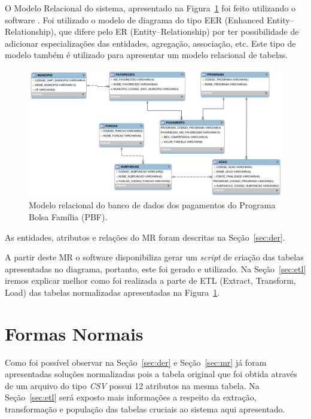 \documentclass[12pt]{article}
\begin{document}
	O Modelo Relacional do sistema, apresentado na Figura~\ref{fig:mr} foi feito utilizando o software \cite{mysql}. Foi utilizado o modelo de diagrama do tipo EER (Enhanced Entity–Relationship), que difere pelo ER (Entity–Relationship) por ter possibilidade de adicionar especializações das entidades, agregação, associação, etc. Este tipo de modelo também é utilizado para apresentar um modelo relacional de tabelas.
	
	\begin{figure}[H]
		\centering
		\includegraphics[width=1\textwidth]{eer.png}
		\caption{Modelo relacional do banco de dados dos pagamentos do Programa Bolsa Família (PBF).}
		\label{fig:mr}
	\end{figure}
	
	As entidades, atributos e relações do MR foram descritas na Seção~\ref{sec:der}. 
	
	A partir deste MR o software disponibiliza gerar um \textit{script} de criação das tabelas apresentadas no diagrama, portanto, este foi gerado e utilizado. Na Seção~\ref{sec:etl} iremos explicar melhor como foi realizada a parte de ETL (Extract, Transform, Load) das tabelas normalizadas apresentadas na Figura~\ref{fig:mr}.
	
	\section{Formas Normais}
	\label{sec:fnormais}
	
	Como foi possível observar na Seção~\ref{sec:der} e Seção~\ref{sec:mr} já foram apresentadas soluções normalizadas pois a tabela original que foi obtida através de um arquivo do tipo \textit{CSV} possui 12 atributos na mesma tabela. Na Seção~\ref{sec:etl} será exposto mais informações a respeito da extração, transformação e população das tabelas cruciais ao sistema aqui apresentado.
	
\end{document}
